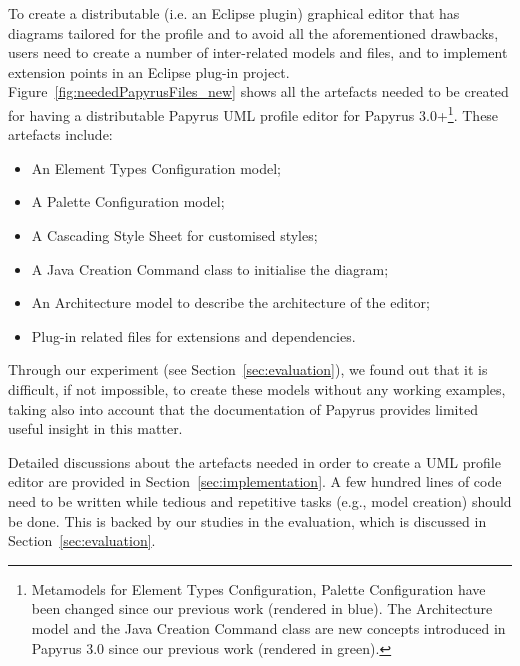 To create a distributable (i.e. an Eclipse plugin) graphical editor that has diagrams tailored for the profile and to avoid all the aforementioned drawbacks, users need to create a number of inter-related models and files, and to implement extension points in an Eclipse plug-in project. 
Figure~\ref{fig:neededPapyrusFiles_new} shows all the artefacts needed to be created for having a distributable Papyrus UML profile editor for Papyrus 3.0+\footnote{Metamodels for Element Types Configuration, Palette Configuration have been changed since our previous work (rendered in blue). The Architecture model and the Java Creation Command class are new concepts introduced in Papyrus 3.0 since our previous work (rendered in green).}.
These artefacts include:
\begin{itemize}
	\item An Element Types Configuration model;
	\item A Palette Configuration model;
	\item A Cascading Style Sheet for customised styles;
	\item A Java Creation Command class to initialise the diagram;
	\item An Architecture model to describe the architecture of the editor;
	\item Plug-in related files for extensions and dependencies.
\end{itemize}

Through our experiment (see Section~\ref{sec:evaluation}), we found out that it is difficult, if not impossible, to create these models without any working examples, taking also into account that the documentation of Papyrus provides limited useful insight in this matter.

Detailed discussions about the artefacts needed in order to create a UML profile editor are provided in Section~\ref{sec:implementation}.
A few hundred lines of code need to be written while tedious and repetitive tasks (e.g., model creation) should be done. 
This is backed by our studies in the evaluation, which is discussed in Section~\ref{sec:evaluation}.

